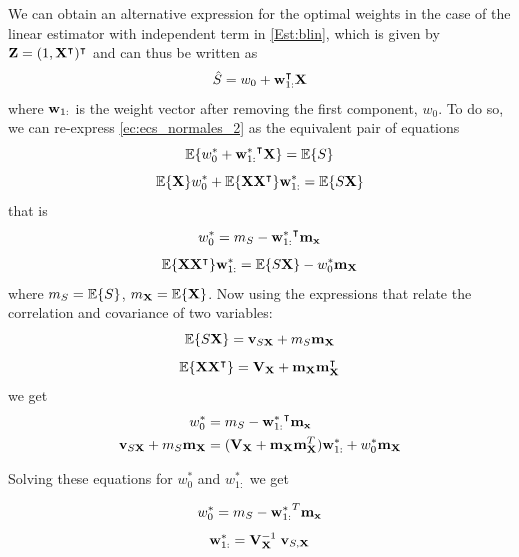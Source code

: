 {We can obtain an alternative expression for the optimal weights in the case of the linear estimator with independent term in \eqref{Est:blin}, which is given by ${\bf Z}=(1, {\bf X}^\intercal)^\intercal$ and can thus be written as
\begin{align}
\hat S = w_0 + {\bf w}_{1:}^\intercal {\bf X}
\end{align}
where ${\bf w}_{1:}$ is the weight vector after removing the first component, $w_0$. To do so, we can re-express \eqref{ec:ecs_normales_2} as the equivalent pair of equations
\begin{equation}
\label{Est:E0}
\mathbb{E}\{w_0^* + {{\bf w}_{1:}^*}^\intercal {\bf X} \} = \mathbb{E}\{S\}
\end{equation}
\begin{equation}
\label{Est:Ex}
\mathbb{E}\{{\bf X}\} w_0^* + \mathbb{E}\{{\bf X}{\bf X}^\intercal\}{\bf w}_{1:}^* = \mathbb{E}\{S{\bf X}\}
\end{equation}
that is
\begin{equation}
w_0^* = m_S - {{\bf w}_{1:}^*}^\intercal{\bf m_x}
\end{equation}
\begin{align}
\label{Est:PrincipioOrtV2b}
\mathbb{E}\{{\bf X} {\bf X}^\intercal \}{\bf w}_{1:}^* = \mathbb{E}\{S {\bf X}\} - w_0^* {\bf m_X}  
\end{align}
where $m_S=\mathbb{E}\{S\}$, $m_{\bf X} =\mathbb{E}\{{\bf X}\}$.} Now using the expressions that relate the correlation and covariance of two variables:
\begin{equation}
\mathbb{E}\{S {\bf X}\} = {\bf v}_{S{\bf X}} + m_S {\bf m_X}
\end{equation}
\begin{equation}
\mathbb{E}\{{\bf X}{\bf X}^\intercal\} = {\bf V_X} + {\bf m_X}{\bf m}_{\bf X}^\intercal
\end{equation}
we get 
{\begin{align}
w_0^* &= m_S  - {{\bf w}_{1:}^*}^\intercal{\bf m_x}  \\
\label{Est:PrincipioOrtV2c}
{\bf v}_{S{\bf X}} + m_S {\bf m_X} 
	&= ({\bf V_X} + {\bf m_X}{\bf m}_{\bf X}^T){\bf w}_{1:}^* + w_0^* {\bf m_X}  
\end{align}}

{Solving these equations for $w_0^*$ and $w_{1:}^*$ we get
\begin{framed}
\begin{equation}
w_0^* = m_S - {{\bf w}_{1:}^*}^T{\bf m_x} 
\label{ec:solucionw0}
\end{equation}
\begin{equation}
\label{ec:solucionw}
{\bf w}_{1:}^* = {{\bf V}_{\bf X}^{-1}} \; {\bf v}_{S,{\bf X}}\end{equation}
\end{framed}}

